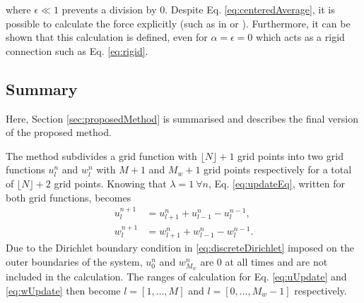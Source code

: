 where $\epsilon \ll 1$ prevents a division by 0. Despite Eq. \eqref{eq:centeredAverage}, it is possible to calculate the force explicitly (such as in \cite{bilbao2009} or \cite{bilbao2009Dafx}). Furthermore, it can be shown that this calculation is defined, even for $\alpha  = \epsilon = 0$ which acts as a rigid connection such as Eq. \eqref{eq:rigid}.

% 

\subsection{Summary}
Here, Section \ref{sec:proposedMethod} is summarised and describes the final version of the proposed method.

The method subdivides a grid function with $\lfloor N\rfloor +1$ grid points into two grid functions $u_l^n$ and $w_l^n$ with $M+1$ and $M_w+1$ grid points respectively for a total of $\lfloor N\rfloor +2$ grid points. Knowing that $\lambda=1\ \forall n$, Eq. \eqref{eq:updateEq}, written for both grid functions, becomes 
\begin{subequations}\label{eq:uwUpdates}
    \begin{align}
        u_l^{n+1} &= u_{l+1}^n + u_{l-1}^n - u_l^{n-1},\label{eq:uUpdate}\\
        w_l^{n+1} &= w_{l+1}^n + w_{l-1}^n - w_l^{n-1}\label{eq:wUpdate}.
    \end{align}
\end{subequations}
%
Due to the Dirichlet boundary condition in \eqref{eq:discreteDirichlet} imposed on the outer boundaries of the system, $u_0^n$ and $w_{M_w}^n$ are $0$ at all times and are not included in the calculation. The ranges of calculation for Eq. \eqref{eq:uUpdate} and \eqref{eq:wUpdate} then become $l = [1, \hdots, M]$ and $l = [0, \hdots, M_w - 1]$ respectively. 

